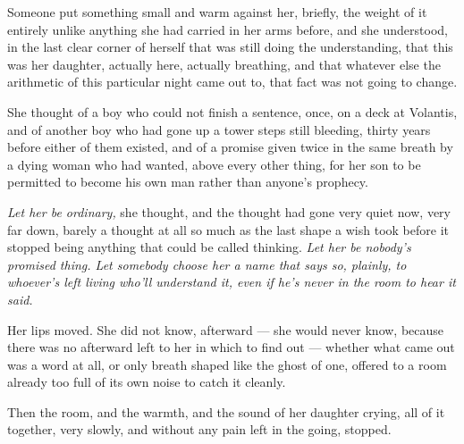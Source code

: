 Someone put something small and warm against her, briefly, the weight of it entirely unlike anything she had carried in her arms before, and she understood, in the last clear corner of herself that was still doing the understanding, that this was her daughter, actually here, actually breathing, and that whatever else the arithmetic of this particular night came out to, that fact was not going to change.

\sceneBreak

She thought of a boy who could not finish a sentence, once, on a deck at Volantis, and of another boy who had gone up a tower steps still bleeding, thirty years before either of them existed, and of a promise given twice in the same breath by a dying woman who had wanted, above every other thing, for her son to be permitted to become his own man rather than anyone’s prophecy.

\textit{Let her be ordinary,} she thought, and the thought had gone very quiet now, very far down, barely a thought at all so much as the last shape a wish took before it stopped being anything that could be called thinking. \textit{Let her be nobody’s promised thing. Let somebody choose her a name that says so, plainly, to whoever’s left living who’ll understand it, even if he’s never in the room to hear it said.}

Her lips moved. She did not know, afterward — she would never know, because there was no afterward left to her in which to find out — whether what came out was a word at all, or only breath shaped like the ghost of one, offered to a room already too full of its own noise to catch it cleanly.

Then the room, and the warmth, and the sound of her daughter crying, all of it together, very slowly, and without any pain left in the going, stopped.
